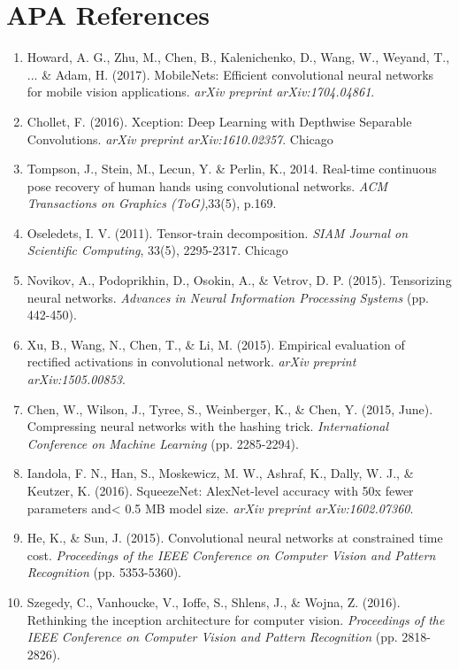 \documentclass{article}
\begin{document}
\section*{APA References}
\begin{enumerate}
\item Howard, A. G., Zhu, M., Chen, B., Kalenichenko, D., Wang, W., Weyand, T., ... \& Adam, H. (2017). MobileNets: Efficient convolutional neural networks for mobile vision applications. \emph{arXiv preprint arXiv:1704.04861}.
\item Chollet, F. (2016). Xception: Deep Learning with Depthwise Separable Convolutions. \emph{arXiv preprint arXiv:1610.02357}.
Chicago	
\item Tompson, J., Stein, M., Lecun, Y. \& Perlin, K., 2014. Real-time continuous pose recovery of human hands using convolutional networks. \emph{ACM Transactions on Graphics (ToG)},33(5), p.169.
\item Oseledets, I. V. (2011). Tensor-train decomposition. \emph{SIAM Journal on Scientific Computing}, 33(5), 2295-2317.
Chicago	
\item Novikov, A., Podoprikhin, D., Osokin, A., \& Vetrov, D. P. (2015). Tensorizing neural networks. \emph{Advances in Neural Information Processing Systems} (pp. 442-450).
\item Xu, B., Wang, N., Chen, T., \& Li, M. (2015). Empirical evaluation of rectified activations in convolutional network. \emph{arXiv preprint arXiv:1505.00853}.
\item Chen, W., Wilson, J., Tyree, S., Weinberger, K., \& Chen, Y. (2015, June). Compressing neural networks with the hashing trick. \emph{International Conference on Machine Learning} (pp. 2285-2294).
\item Iandola, F. N., Han, S., Moskewicz, M. W., Ashraf, K., Dally, W. J., \& Keutzer, K. (2016). SqueezeNet: AlexNet-level accuracy with 50x fewer parameters and< 0.5 MB model size. \emph{arXiv preprint arXiv:1602.07360}.
\item He, K., \& Sun, J. (2015). Convolutional neural networks at constrained time cost. \emph{Proceedings of the IEEE Conference on Computer Vision and Pattern Recognition} (pp. 5353-5360).
\item Szegedy, C., Vanhoucke, V., Ioffe, S., Shlens, J., \& Wojna, Z. (2016). Rethinking the inception architecture for computer vision. \emph{Proceedings of the IEEE Conference on Computer Vision and Pattern Recognition} (pp. 2818-2826).

\end{enumerate}
\end{document}
